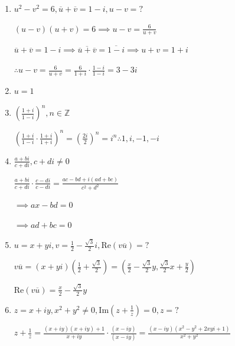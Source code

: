 \documentclass[12pt, openright, a4paper, twoside, english, brazil]{article}
\newenvironment{qitem}{
  \color{black}
\item}{\vspace{10pt}}
\begin{document}
\begin{enumerate}[\bfseries 1.]
  \begin{qitem} %
    $u^2-v^2=6,\overline u+\overline v=1-i,u-v=?$

    \color{red}
    $\displaystyle (u-v)(u+v)=6\implies u-v=\frac{6}{u+v}$

    $\overline u+\overline v=1-i\implies \overline{\overline u+\overline
    v}=\overline{1-i}\implies u+v=1+i$

    $\displaystyle \therefore
    u-v=\frac{6}{u+v}=\frac{6}{1+i}\cdot\frac{1-i}{1-i}=3-3i$
  \end{qitem}

  \begin{qitem} %
     $u=1$
  \end{qitem}

  \begin{qitem} %
    $\displaystyle\left(\frac{1+i}{1-i}\right)^n, n\in\mathbb{Z}$

    \color{red}

    $\displaystyle
    \left(\frac{1+i}{1-i}\cdot\frac{1+i}{1+i}\right)^n=\left(\frac{2i}{2}\right)^n=i^n\therefore
    1,i,-1,-i$
  \end{qitem}

  \begin{qitem} %
    $\displaystyle \frac{a+bi}{c+di}, c+di\ne 0$

    \color{red}
    $\displaystyle
    \frac{a+bi}{c+di}\cdot\frac{c-di}{c-di}=\frac{ac-bd+i(ad+bc)}{c^2+d^2}$

    $\implies  ax-bd=0$

    $\implies  ad+bc=0$
  \end{qitem}

  \begin{qitem} %
    $\displaystyle u=x+yi, v=\frac12-\frac{\sqrt{3}}{2}i,
    \text{Re}(v\overline u)=?$

    \color{red}
    $\displaystyle v\overline u=(x+yi)(\frac12 +\frac{\sqrt{3}}{2})=(\frac
    x2 - \frac{\sqrt{3}}{2}y,\frac{\sqrt{3}}{2}x+\frac y2)$

    $\displaystyle \text{Re}(v\overline u)=\frac x2 -\frac{\sqrt{3}}{2}y$
  \end{qitem}

  \begin{qitem} %
    $\displaystyle z=x+iy,x^2+y^2\ne 0, \text{Im}(z+\frac{1}{z})=0,z=?$

    \color{red}
    $\displaystyle
    z+\frac{1}{z}=\frac{(x+iy)(x+iy)+1}{x+iy}\cdot\frac{(x-iy)}{(x-iy)}=\frac{(x-iy)(x^2-y^2+2xyi+1)}{x^2+y^2}$


\end{qitem}
\end{enumerate}
\end{document}
